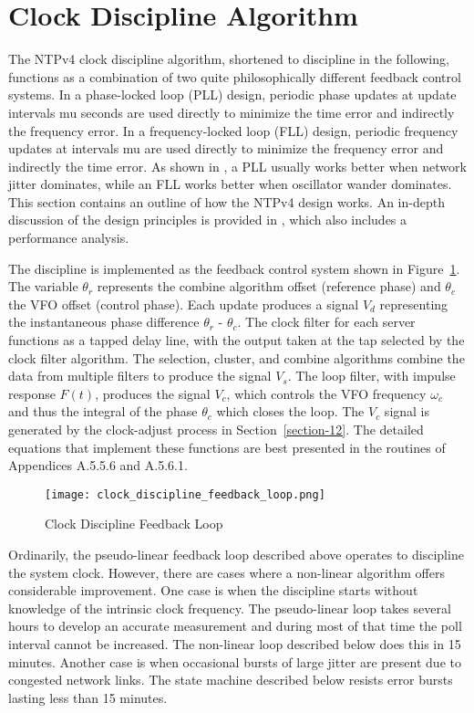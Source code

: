\section{Clock Discipline Algorithm}
\label{section-11-3}

The NTPv4 clock discipline algorithm, shortened to discipline in the
following, functions as a combination of two quite philosophically
different feedback control systems.  In a phase-locked loop (PLL)
design, periodic phase updates at update intervals mu seconds are
used directly to minimize the time error and indirectly the frequency
error.  In a frequency-locked loop (FLL) design, periodic frequency
updates at intervals mu are used directly to minimize the frequency
error and indirectly the time error.  As shown in \cite{ref7}, a PLL
usually works better when network jitter dominates, while an FLL
works better when oscillator wander dominates.  This section contains
an outline of how the NTPv4 design works.  An in-depth discussion of
the design principles is provided in \cite{ref7}, which also includes a
performance analysis.

The discipline is implemented as the feedback control system shown in
Figure~\ref{clock_discipline_feedback_loop}.  The variable $ \theta_r $ represents the combine algorithm
offset (reference phase) and $ \theta_c $ the VFO offset (control phase).
Each update produces a signal $ V_d $ representing the instantaneous
phase difference $ \theta_r $ - $ \theta_c $.  The clock filter for each server
functions as a tapped delay line, with the output taken at the tap
selected by the clock filter algorithm.  The selection, cluster, and
combine algorithms combine the data from multiple filters to produce
the signal $ V_s $.  The loop filter, with impulse response $ F(t) $,
produces the signal $ V_c $, which controls the VFO frequency $ \omega_c $ and
thus the integral of the phase $ \theta_c $ which closes the loop.  The
$ V_c $ signal is generated by the clock-adjust process in Section~\ref{section-12}.
The detailed equations that implement these functions are best
presented in the routines of Appendices A.5.5.6 and A.5.6.1.

\begin{figure}
\centering
\texttt{[image: clock\_discipline\_feedback\_loop.png]}
\caption{Clock Discipline Feedback Loop}
\label{clock_discipline_feedback_loop}
\end{figure}

Ordinarily, the pseudo-linear feedback loop described above operates
to discipline the system clock.  However, there are cases where a
non-linear algorithm offers considerable improvement.  One case is
when the discipline starts without knowledge of the intrinsic clock
frequency.  The pseudo-linear loop takes several hours to develop an
accurate measurement and during most of that time the poll interval
cannot be increased.  The non-linear loop described below does this
in 15 minutes.  Another case is when occasional bursts of large
jitter are present due to congested network links.  The state machine
described below resists error bursts lasting less than 15 minutes.

